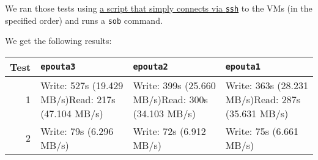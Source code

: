 We ran those tests using
\href{../experiments/profiles/supernode/files/run-SOB.sh}{a script that
simply connects via \texttt{ssh}} to the VMs (in the specified order)
and runs a \texttt{sob} command.

We get the following results:

\begin{longtable}[]{@{}rlll@{}}
\toprule
\begin{minipage}[b]{0.07\columnwidth}\raggedleft\strut
Test\strut
\end{minipage} & \begin{minipage}[b]{0.14\columnwidth}\raggedright\strut
\texttt{epouta3}\strut
\end{minipage} & \begin{minipage}[b]{0.14\columnwidth}\raggedright\strut
\texttt{epouta2}\strut
\end{minipage} & \begin{minipage}[b]{0.14\columnwidth}\raggedright\strut
\texttt{epouta1}\strut
\end{minipage}\tabularnewline
\midrule
\endhead
\begin{minipage}[t]{0.07\columnwidth}\raggedleft\strut
1\strut
\end{minipage} & \begin{minipage}[t]{0.14\columnwidth}\raggedright\strut
Write: 527s (19.429 MB/s)Read: 217s (47.104 MB/s)\strut
\end{minipage} & \begin{minipage}[t]{0.14\columnwidth}\raggedright\strut
Write: 399s (25.660 MB/s)Read: 300s (34.103 MB/s)\strut
\end{minipage} & \begin{minipage}[t]{0.14\columnwidth}\raggedright\strut
Write: 363s (28.231 MB/s)Read: 287s (35.631 MB/s)\strut
\end{minipage}\tabularnewline
\begin{minipage}[t]{0.07\columnwidth}\raggedleft\strut
2\strut
\end{minipage} & \begin{minipage}[t]{0.14\columnwidth}\raggedright\strut
Write: 79s (6.296 MB/s)\strut
\end{minipage} & \begin{minipage}[t]{0.14\columnwidth}\raggedright\strut
Write: 72s (6.912 MB/s)\strut
\end{minipage} & \begin{minipage}[t]{0.14\columnwidth}\raggedright\strut
Write: 75s (6.661 MB/s)\strut
\end{minipage}\tabularnewline

\end{longtable}
